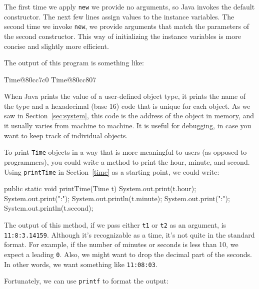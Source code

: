 \documentclass[12pt]{book}
\makeatletter
\renewcommand{\section}{\@startsection {section}{1}{\z@}%
    {-3.5ex \@plus -1ex \@minus -.2ex}%
    {0.7ex \@plus.2ex}%
    {\normalfont\Large\bfseries}}
\theoremstyle{exercise}
\newcommand{\java}[1]{\lstinline{#1}} %
\makeatother
\begin{document}
The first time we apply \java{new} we provide no arguments, so Java invokes the default constructor.
The next few lines assign values to the instance variables.
The second time we invoke \java{new}, we provide arguments that match the parameters of the second constructor.
This way of initializing the instance variables is more concise and slightly more efficient.

\label{printobject}


The output of this program is something like:

\begin{stdout}
Time@80cc7c0
Time@80cc807
\end{stdout}

When Java prints the value of a user-defined object type, it prints the name of the type and a hexadecimal (base 16) code that is unique for each object.
As we saw in Section~\ref{sec:system}, this code is the address of the object in memory, and it usually varies from machine to machine.
It is useful for debugging, in case you want to keep track of individual objects.

To print \java{Time} objects in a way that is more meaningful to users (as opposed to programmers), you could write a method to print the hour, minute, and second.
Using \java{printTime} in Section~\ref{time} as a starting point, we could write:

\begin{code}
    public static void printTime(Time t) {
        System.out.print(t.hour);
        System.out.print(":");
        System.out.println(t.minute);
        System.out.print(":");
        System.out.println(t.second);
    }
\end{code}

The output of this method, if we pass either \java{t1} or \java{t2} as an argument, is {\tt 11:8:3.14159}.
Although it's recognizable as a time, it's not quite in the standard format.
For example, if the number of minutes or seconds is less than 10, we expect a leading {\tt 0}.
Also, we might want to drop the decimal part of the seconds.
In other words, we want something like {\tt 11:08:03}.

Fortunately, we can use \java{printf} to format the output:
\end{document}
